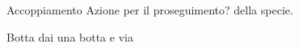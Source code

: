 
\elemento
{Accoppiamento}
{Azione per il proseguimento? della specie.}

\elemento
{Botta}
{dai una botta e via}









